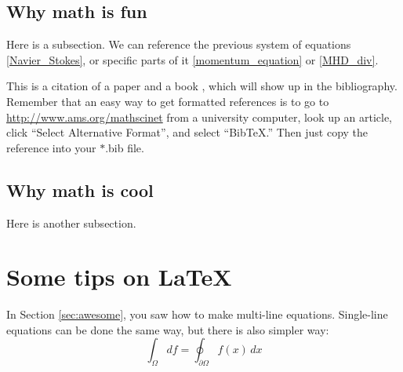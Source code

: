 


\subsection{\texorpdfstring{Why math is fun}{}}\label{subsec:fun}

Here is a subsection.  We can reference the previous system of equations \eqref{Navier_Stokes}, or specific parts of it \eqref{momentum_equation} or \eqref{MHD_div}.  

This is a citation of a paper \cite{Beale_Kato_Majda_1984} and a book \cite{Chandrasekhar_1961}, which will show up in the bibliography.  Remember that an easy way to get formatted references is to go to \url{http://www.ams.org/mathscinet} from a university computer, look up an article, click ``Select Alternative Format'', and select ``BibTeX.''  Then just copy the reference into your $*$.bib file.



\subsection{\texorpdfstring{Why math is cool}{}}\label{subsec:cool}

Here is another subsection.

\section{\texorpdfstring{Some tips on \LaTeX}{}}\label{sec:latex}

In Section \ref{sec:awesome}, you saw how to make multi-line equations.  Single-line equations can be done the same way, but there is also simpler way:
\[
\int_{\Omega}df = \oint_{\partial\Omega}f(x) \, dx
\]


